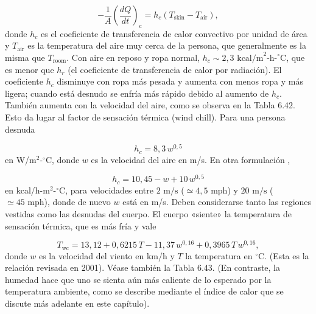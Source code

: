 \documentclass[12pt]{book}
\begin{document}


\begin{equation}
-\frac{1}{A}\left(\frac{dQ}{dt}\right)_{\text{c}} = h_c(T_{\text{skin}} - T_{\text{air}}),
\label{eq:661}
\end{equation}
donde $h_c$ es el coeficiente de transferencia de calor convectivo por unidad de área y $T_{\text{air}}$ es la temperatura del aire muy cerca de la persona, que generalmente es la misma que $T_{\text{room}}$. Con aire en reposo y ropa normal, $h_c \sim 2{,}3\text{ kcal/m}^2\text{-h-}^\circ\text{C}$, que es menor que $h_r$ (el coeficiente de transferencia de calor por radiación). El coeficiente $h_c$ disminuye con ropa más pesada y aumenta con menos ropa y más ligera; cuando está desnudo se enfría más rápido debido al aumento de $h_c$. También aumenta con la velocidad del aire, como se observa en la Tabla 6.42. Esto da lugar al factor de sensación térmica (wind chill). Para una persona desnuda

\begin{equation}
h_c = 8{,}3\, w^{0{,}5}
\label{eq:662}
\end{equation}
en W/m$^2$-$^\circ$C, donde $w$ es la velocidad del aire en m/s. En otra formulación \cite{19},

\begin{equation}
h_c = 10{,}45 - w + 10\, w^{0{,}5}
\label{eq:663}
\end{equation}
en kcal/h-m$^2$-$^\circ$C, para velocidades entre $2\text{ m/s}$ ($\simeq 4{,}5\text{ mph}$) y $20\text{ m/s}$ ($\simeq 45\text{ mph}$), donde de nuevo $w$ está en m/s. Deben considerarse tanto las regiones vestidas como las desnudas del cuerpo. El cuerpo «siente» la temperatura de sensación térmica, que es más fría y vale

\begin{equation}
T_{\text{wc}} = 13{,}12 + 0{,}6215\,T - 11{,}37\, w^{0{,}16} + 0{,}3965\,T\, w^{0{,}16},
\label{eq:664}
\end{equation}
donde $w$ es la velocidad del viento en km/h y $T$ la temperatura en $^\circ$C. (Esta es la relación revisada en 2001). Véase también la Tabla 6.43. (En contraste, la humedad hace que uno se sienta aún más caliente de lo esperado por la temperatura ambiente, como se describe mediante el índice de calor que se discute más adelante en este capítulo).
\end{document}
